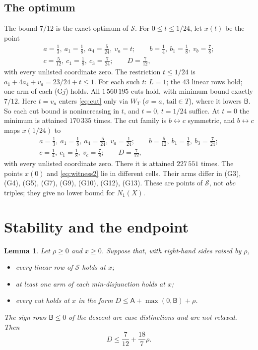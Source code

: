 \documentclass{amsart}
\newtheorem{lemma}{Lemma}[section]
\numberwithin{equation}{section}
\numberwithin{table}{section}
\begin{document}
\subsection{The optimum}\label{sec:opt}
The bound $7/12$ is the exact optimum of $\mathcal S$. For $0\le t\le1/24$, let $x(t)$ be the point
\begin{equation}\label{eq:witness}
 \begin{gathered}
  a=\tfrac13,\ a_1=\tfrac18,\ a_4=\tfrac5{24},\ v_a=t;\qquad
  b=\tfrac14,\ b_1=\tfrac18,\ v_b=\tfrac78;\\
  c=\tfrac5{12},\ c_1=\tfrac18,\ c_3=\tfrac7{24};\qquad
  D=\tfrac7{12},
 \end{gathered}
\end{equation}
with every unlisted coordinate zero. The restriction $t\le1/24$ is
$a_1+4a_4+v_a=23/24+t\le1$. For each such $t$: $L=1$; the $43$ linear rows
hold; one arm of each (G$j$) holds. All $1\,560\,195$ cuts hold, with minimum
bound exactly $7/12$. Here $t=v_a$ enters \eqref{eq:cut} only via
$W_T$ ($\sigma=a$, $\mathrm{tail}\in T$), where it lowers $\mathsf B$. So each
cut bound is nonincreasing in $t$, and $t=0$, $t=1/24$ suffice. At $t=0$ the
minimum is attained $170\,335$ times. The cut family is
$b\leftrightarrow c$ symmetric, and $b\leftrightarrow c$ maps $x(1/24)$ to
\begin{equation}\label{eq:witness2}
\begin{gathered}
 a=\tfrac13,\ a_1=\tfrac18,\ a_4=\tfrac5{24},\ v_a=\tfrac1{24};\qquad
 b=\tfrac5{12},\ b_1=\tfrac18,\ b_3=\tfrac7{24};\\
 c=\tfrac14,\ c_1=\tfrac18,\ v_c=\tfrac78;\qquad D=\tfrac7{12},
\end{gathered}
\end{equation}
with every unlisted coordinate zero. There it is attained $227\,551$ times.
The points $x(0)$ and \eqref{eq:witness2} lie in different cells. Their arms
differ in (G3), (G4), (G5), (G7), (G9), (G10), (G12), (G13). These are points
of $\mathcal S$, not $abc$ triples; they give no lower bound for $N_1(X)$.


\section{Stability and the endpoint}\label{sec:end}

\begin{lemma}\label{lem:stab}
Let $\rho\ge0$ and $x\ge0$. Suppose that, with right-hand sides raised by
$\rho$,
\begin{itemize}
\item every linear row of $\mathcal S$ holds at $x$;
\item at least one arm of each min-disjunction holds at $x$;
\item every cut holds at $x$ in the form $D\le\mathsf A+\max(0,\mathsf B)+\rho$.
\end{itemize}
The sign rows $\mathsf B\le0$ of the descent are case distinctions and are not
relaxed. Then
\begin{equation}\label{eq:stab}
 D\le\frac7{12}+\frac{18}{7}\rho .
\end{equation}
\end{lemma}
\end{document}
